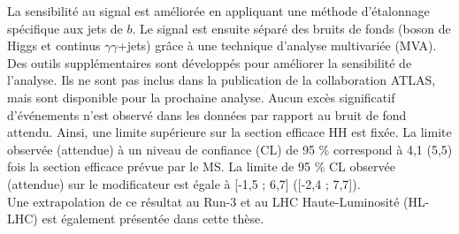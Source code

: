 La sensibilité au signal \HHyybb est améliorée en appliquant une méthode d'étalonnage spécifique aux jets de $b$. Le signal est ensuite séparé des bruits de fonds (boson de Higgs et continus $\gamma\gamma$+jets) grâce à une technique d'analyse multivariée (MVA). Des outils supplémentaires sont développés pour améliorer la sensibilité de l'analyse. Ils ne sont pas inclus dans la publication de la collaboration ATLAS, mais sont disponible pour la prochaine analyse.  Aucun excès significatif d'événements \HHyybb n'est observé dans les données par rapport au bruit de fond attendu. Ainsi, une limite supérieure sur la section efficace HH est fixée. La limite observée (attendue) à un niveau de confiance (CL) de 95 \% correspond à 4,1 (5,5) fois la section efficace prévue par le MS. La limite de 95 \% CL observée (attendue) sur le modificateur \kl est égale à [-1,5 ; 6,7] ([-2,4 ; 7,7]). \\
Une extrapolation de ce résultat au Run-3 et au LHC Haute-Luminosité (HL-LHC) est également présentée dans cette thèse.
